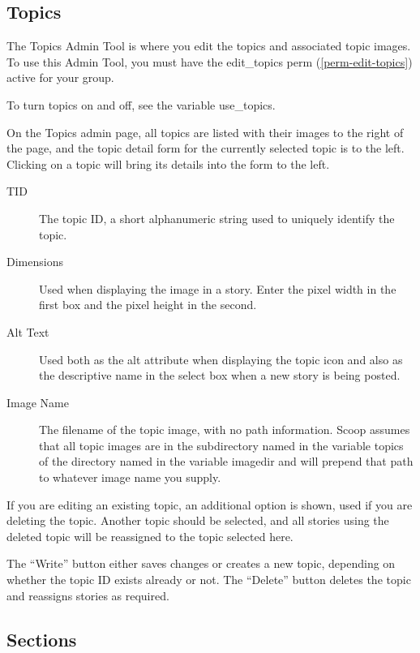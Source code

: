 \subsection{Topics}
\label{admin-tools-topics}

The Topics Admin Tool is where you edit the topics and associated topic images.  To use this Admin Tool, you must have the edit\_topics perm (\ref{perm-edit-topics}) active for your group.

To turn topics on and off, see the variable use\_topics.

On the Topics admin page, all topics are listed with their images to the right of the page, and the topic detail form for the currently selected topic is to the left.  Clicking on a topic will bring its details into the form to the left.

\begin{description}
\item[TID] The topic ID, a short alphanumeric string used to uniquely identify the topic.
\item[Dimensions] Used when displaying the image in a story.  Enter the pixel width in the first box and the pixel height in the second.
\item[Alt Text] Used both as the alt attribute when displaying the topic icon and also as the descriptive name in the select box when a new story is being posted.
\item[Image Name] The filename of the topic image, with no path information.  Scoop assumes that all topic images are in the subdirectory named in the variable topics of the directory named in the variable imagedir and will prepend that path to whatever image name you supply.
\end{description}

If you are editing an existing topic, an additional option is shown, used if you are deleting the topic.  Another topic should be selected, and all stories using the deleted topic will be reassigned to the topic selected here.

The ``Write'' button either saves changes or creates a new topic, depending on whether the topic ID exists already or not.  The ``Delete'' button deletes the topic and reassigns stories as required.


\subsection{Sections}
\label{admin-tools-sections}

